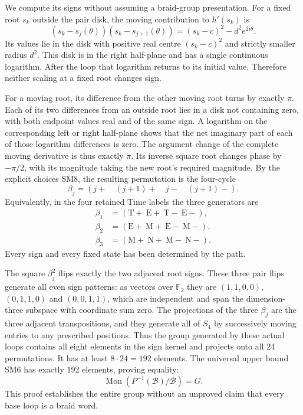 \documentclass[11pt]{article}
\begin{document}
We compute its signs without assuming a braid-group presentation.
For a fixed root $s_k$ outside the pair disk, the moving contribution
to $h'(s_k)$ is
\[
 (s_k-s_j(\theta))(s_k-s_{j+1}(\theta))
       =(s_k-c)^2-d^2e^{2i\theta}.
\]
Its values lie in the disk with positive real centre $(s_k-c)^2$
and strictly smaller radius $d^2$. This disk is in the right
half-plane and has a single continuous logarithm. After the loop
that logarithm returns to its initial value. Therefore neither
scaling at a fixed root changes sign.

For a moving root, its difference from the other moving root turns
by exactly $\pi$. Each of its two differences from an outside
root lies in a disk not containing zero, with both endpoint values
real and of the same sign. A logarithm on the corresponding left
or right half-plane shows that the net imaginary part of each of
those logarithm differences is zero. The argument change of the
complete moving derivative is thus exactly $\pi$. Its inverse
square root changes phase by $-\pi/2$, with its magnitude taking
the new root's required magnitude. By the explicit choices SM8,
the resulting permutation is the four-cycle
\begin{equation}
 \beta_j=(j+\quad(j+1)+\quad j-\quad(j+1)-).
 \tag{SM10}
\end{equation}
Equivalently, in the four retained Time labels the three generators
are
\begin{equation}
 \begin{split}
 \beta_1&=(\mathrm T+\ \mathrm E+\ \mathrm T-\ \mathrm E-),\\
 \beta_2&=(\mathrm E+\ \mathrm M+\ \mathrm E-\ \mathrm M-),\\
 \beta_3&=(\mathrm M+\ \mathrm N+\ \mathrm M-\ \mathrm N-).
 \end{split}\tag{SM11}
\end{equation}
Every sign and every fixed state has been determined by the path.

The square $\beta_j^2$ flips exactly the two adjacent root signs.
These three pair flips generate all even sign patterns: as vectors
over $\mathbb F_2$ they are
$(1,1,0,0)$, $(0,1,1,0)$ and $(0,0,1,1)$, which are independent
and span the dimension-three subspace with coordinate sum zero.
The projections of the three $\beta_j$ are the three adjacent
transpositions, and they generate all of $S_4$ by successively
moving entries to any prescribed positions. Thus the group
generated by these actual loops contains all eight elements in
the sign kernel and projects onto all 24 permutations. It has
at least $8\cdot24=192$ elements. The universal upper bound SM6
has exactly 192 elements, proving equality:
\begin{equation}
 \boxed{\operatorname{Mon}(P^{-1}(\mathcal B)/\mathcal B)=G.}
 \tag{SM12}
\end{equation}
This proof establishes the entire group without an unproved claim
that every base loop is a braid word.
\end{document}
